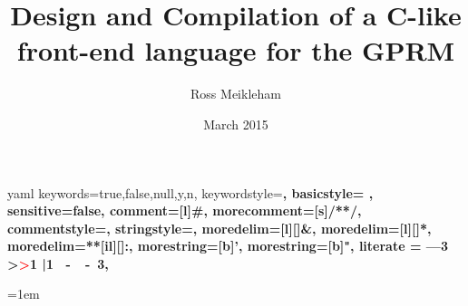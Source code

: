 \documentclass{l4proj}
\begin{document}
\makeatletter

\newcommand\language@yaml{yaml}

\expandafter\expandafter\expandafter\lstdefinelanguage
\expandafter{\language@yaml}
{
  keywords={true,false,null,y,n},
  keywordstyle=\color{darkgray}\bfseries,
                basicstyle=%
                \ttfamily
                \lst@ifdisplaystyle\scriptsize\fi,
  sensitive=false,
  comment=[l]{\#},
  morecomment=[s]{/*}{*/},
  commentstyle=\color{purple}\ttfamily,
  stringstyle=\YAMLvaluestyle\ttfamily,
  moredelim=[l][\color{orange}]{\&},
  moredelim=[l][\color{magenta}]{*},
  moredelim=**[il][\YAMLcolonstyle{:}\YAMLvaluestyle]{:},   %
  morestring=[b]',
  morestring=[b]",
  literate =    {---}{{\ProcessThreeDashes}}3
                {>}{{\textcolor{red}\textgreater}}1     
                {|}{{\textcolor{red}\textbar}}1 
                {\ -\ }{{\mdseries\ -\ }}3,
}


\title{Design and Compilation of a C-like front-end language for the GPRM}
\author{Ross Meikleham}
\date{March 2015}
\maketitle



\educationalconsent

\tableofcontents

\setlength{\parindent}{0pt}









\emergencystretch=1em
\raggedright


\end{document}
